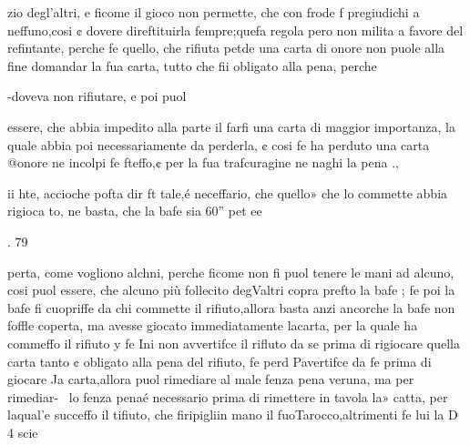 \documentclass[12pt,a6paper]{article}
\begin{document}
 
 

 

 

 

 

 

 

 

zio degl’altri, e ficome il gioco
non permette, che con frode f
pregiudichi a neffuno,cosi ¢ dovere direftituirla fempre;quefa
regola pero non milita a favore
del refintante, perche fe quello,
che rifiuta petde una carta di
onore non puole alla fine domandar la fua carta, tutto che
fii obligato alla pena, perche

-doveva non rifiutare, e poi puol

essere, che abbia impedito alla
parte il farfi una carta di maggior importanza, la quale abbia poi necessariamente da perderla, ¢ cosi fe ha perduto una
carta @onore ne incolpi fe fteffo,¢ per la fua trafcuragine ne
naghi la pena .,

ii hte, accioche pofta dir ft
tale,é neceffario, che quello»
che lo commette abbia rigioca
to, ne basta, che la bafe sia 60”
pet
ee
   
 
  
   
   
 
 
  
  
  
   
  
  
  
  

. 79

perta, come vogliono alchni,
perche ficome non fi puol tenere le mani ad alcuno, cosi puol
essere, che alcuno più follecito
degValtri copra prefto la bafe ;
fe poi la bafe fi cuopriffe da chi
commette il rifiuto,allora basta
anzi ancorche la bafe non foffle
coperta, ma avesse giocato immediatamente lacarta, per la
quale ha commeffo il rifiuto y
fe Ini non avvertifce il rifluto da
se prima di rigiocare quella carta tanto ¢ obligato alla pena del
rifiuto, fe perd Pavertifce da fe
prima di giocare Ja carta,allora
puol rimediare al male fenza
pena veruna, ma per rimediar-~
lo fenza penaé necessario prima di rimettere in tavola la»
catta, per laqual’e succeffo il
tifiuto, che firipigliin mano il
fuoTarocco,altrimenti fe lui la
D 4 scie
 
 

 

 

 

 

 
\end{document}
